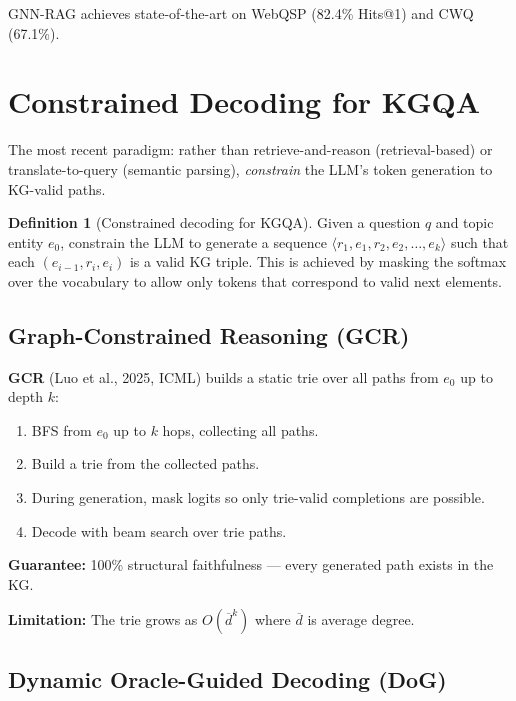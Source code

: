 \documentclass[11pt,a4paper,oneside,openany]{book}
\theoremstyle{definition}
\newtheorem{definition}{Definition}[chapter]
\theoremstyle{plain}
\theoremstyle{remark}
\begin{document}
GNN-RAG achieves state-of-the-art on WebQSP (82.4\% Hits@1) and CWQ (67.1\%).

\section{Constrained Decoding for KGQA}\label{sec:constrained-decoding}

The most recent paradigm: rather than retrieve-and-reason (retrieval-based) or translate-to-query (semantic parsing), \emph{constrain} the LLM's token generation to KG-valid paths.

\begin{definition}[Constrained decoding for KGQA]
	Given a question $q$ and topic entity $e_0$, constrain the LLM to generate a sequence $\langle r_1, e_1, r_2, e_2, \dots, e_k \rangle$ such that each $(e_{i-1}, r_i, e_i)$ is a valid KG triple. This is achieved by masking the softmax over the vocabulary to allow only tokens that correspond to valid next elements.
\end{definition}

\subsection{Graph-Constrained Reasoning (GCR)}

\textbf{GCR} (Luo et al., 2025, ICML) builds a static trie over all paths from $e_0$ up to depth $k$:

\begin{enumerate}
	\item BFS from $e_0$ up to $k$ hops, collecting all paths.
	\item Build a trie from the collected paths.
	\item During generation, mask logits so only trie-valid completions are possible.
	\item Decode with beam search over trie paths.
\end{enumerate}

\textbf{Guarantee:} 100\% structural faithfulness --- every generated path exists in the KG.

\textbf{Limitation:} The trie grows as $O(\overline{d}^k)$ where $\overline{d}$ is average degree.

\subsection{Dynamic Oracle-Guided Decoding (DoG)}
\end{document}
